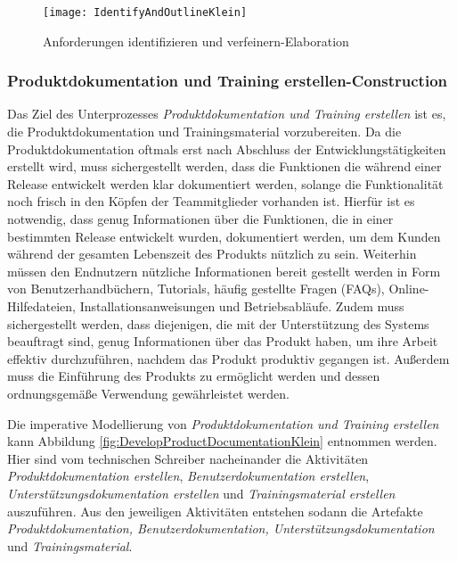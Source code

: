 \begin{figure}[[!htbp]
\begin{center}
  \texttt{[image: IdentifyAndOutlineKlein]} %
  \caption{Anforderungen identifizieren und verfeinern-Elaboration}
  \label{fig:IdentifyAndOutlineKlein}
\end{center}
\end{figure}


\subsubsection{Produktdokumentation und Training erstellen-Construction}
 Das Ziel des Unterprozesses \textit{Produktdokumentation und Training erstellen} ist es, die Produktdokumentation und Trainingsmaterial vorzubereiten. Da die Produktdokumentation oftmals erst nach Abschluss der Entwicklungstätigkeiten erstellt wird, muss sichergestellt werden, dass die Funktionen die während einer Release entwickelt werden klar dokumentiert werden, solange die Funktionalität noch frisch in den Köpfen der Teammitglieder vorhanden ist.\newline
 Hierfür ist es notwendig, dass genug Informationen über die Funktionen, die in einer bestimmten Release entwickelt wurden, dokumentiert werden, um dem Kunden während der gesamten Lebenszeit des Produkts nützlich zu sein.\newline
 Weiterhin müssen den Endnutzern nützliche Informationen bereit gestellt werden in Form von Benutzerhandbüchern, Tutorials, häufig gestellte Fragen (FAQs), Online-Hilfedateien, Installationsanweisungen und Betriebsabläufe. \newline
 Zudem muss sichergestellt werden, dass diejenigen, die mit der Unterstützung des Systems beauftragt sind, genug Informationen über das Produkt haben, um ihre Arbeit effektiv durchzuführen, nachdem das Produkt produktiv gegangen ist. \newline
 Außerdem muss die Einführung des Produkts zu ermöglicht werden und dessen ordnungsgemäße Verwendung gewährleistet werden.\newline
 
 Die imperative Modellierung von \textit{Produktdokumentation und Training erstellen} kann Abbildung \ref{fig:DevelopProductDocumentationKlein} entnommen werden.\newline
 Hier sind vom technischen Schreiber nacheinander die Aktivitäten \textit{Produktdokumentation erstellen}, \textit{Benutzerdokumentation erstellen}, \textit{Unterstützungsdokumentation erstellen} und \textit{Trainingsmaterial erstellen} auszuführen. Aus den jeweiligen Aktivitäten entstehen sodann die Artefakte \textit{Produktdokumentation, Benutzerdokumentation, Unterstützungsdokumentation} und \textit{Trainingsmaterial}.
 
